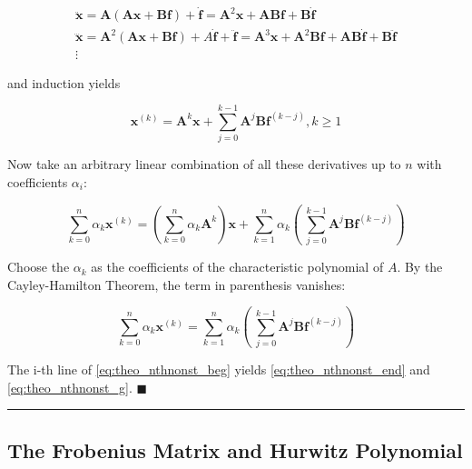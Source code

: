 \begin{gather}
\ddot{\mathbf{x}} = \mathbf{A}\left(\mathbf{Ax} + \mathbf{Bf}\right) + \dot{\mathbf{f}} = \mathbf{A}^2\mathbf{x} + \mathbf{ABf} + \mathbf{B}\dot{\mathbf{f}}\\\nonumber
\dddot{\mathbf{x}} = \mathbf{A}^2\left(\mathbf{Ax} + \mathbf{Bf}\right) + A\dot{\mathbf{f}} + \ddot{\mathbf{f}} = \mathbf{A}^3\mathbf{x} + \mathbf{A}^2\mathbf{Bf} + \mathbf{AB}\dot{\mathbf{f}} + \mathbf{B}\ddot{\mathbf{f}} \\\nonumber
\vdots
\end{gather} 

	\noindent and induction yields

\begin{equation} \mathbf{x}^{(k)} = \mathbf{A}^k \mathbf{x} + \sum_{j=0}^{k-1} \mathbf{A}^j \mathbf{Bf}^{(k-j)}, k\geq 1\end{equation}

        Now take an arbitrary linear combination of all these derivatives up to $n$ with coefficients $\alpha_i$:

\small \begin{equation} \sum_{k=0}^n \alpha_k  \mathbf{x}^{(k)} = \left(\sum_{k=0}^n \alpha_k \mathbf{A}^k \right) \mathbf{x} + \sum_{k=1}^n \alpha_k \left(\ \sum_{j=0}^{k-1} \mathbf{A}^j \mathbf{Bf}^{(k-j)}\right) \end{equation}\normalsize

        Choose the $\alpha_k$ as the coefficients of the characteristic polynomial of $A$. By the Cayley-Hamilton Theorem, the term in parenthesis vanishes:

\begin{equation} \sum_{k=0}^n \alpha_k \mathbf{x}^{(k)} = \sum_{k=1}^n \alpha_k \left(\ \sum_{j=0}^{k-1} \mathbf{A}^j \mathbf{Bf}^{(k-j)}\right) \label{eq:theo_nthnonst_beg}\end{equation}

        The i-th line of \eqref{eq:theo_nthnonst_beg} yields \eqref{eq:theo_nthnonst_end} and \eqref{eq:theo_nthnonst_g}.
\hfill$\blacksquare$
\vspace{5mm}
\hrule
\vspace{5mm} %

\subsection{The Frobenius Matrix and Hurwitz Polynomial} %

